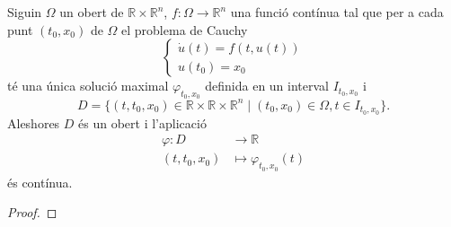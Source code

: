 \documentclass[../Apunts.tex]{subfiles}
\begin{document}
	\begin{theorem}
		\label{thm:continuitat respecte les condicions inicials}
		Siguin \(\Omega\) un obert de \(\mathbb{R}\times\mathbb{R}^{n}\), \(f\colon\Omega\longrightarrow\mathbb{R}^{n}\) una funció contínua tal que per a cada punt \((t_{0},x_{0})\) de \(\Omega\) el problema de Cauchy
		\[\begin{cases}
			\dot{u}(t)=f(t,u(t)) \\
			u(t_{0})=x_{0}
		\end{cases}\]
		té una única solució maximal \(\varphi_{t_{0},x_{0}}\) definida en un interval \(I_{t_{0},x_{0}}\) i
		\[D=\{(t,t_{0},x_{0})\in\mathbb{R}\times\mathbb{R}\times\mathbb{R}^{n}\mid(t_{0},x_{0})\in\Omega,t\in I_{t_{0},x_{0}}\}.\]
		Aleshores \(D\) és un obert i l'aplicació
		\begin{align*}
			\varphi\colon D&\longrightarrow\mathbb{R} \\
			(t,t_{0},x_{0})&\longmapsto\varphi_{t_{0},x_{0}}(t)
		\end{align*}
		és contínua.
		\begin{proof}
		\end{proof}
	\end{theorem}
	
	
	
	
	
	
	
\end{document}
